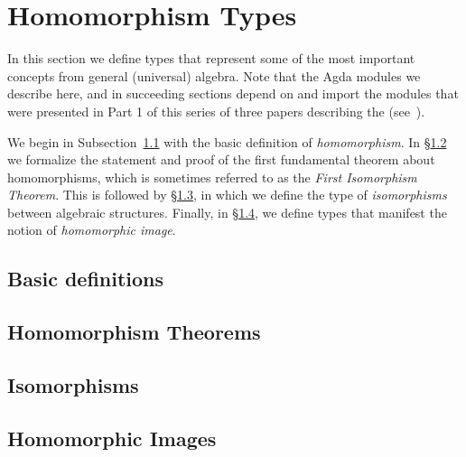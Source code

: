 \section{Homomorphism Types}\label{sec:homomorphism-types}
In this section we define types that represent some of the most important concepts from general (universal) algebra.  Note that the Agda modules we describe here, and in succeeding sections depend on and import the modules that were presented in Part 1 of this series of three papers describing the \agdaualib (see~\cite{DeMeo:2021-1}). 

We begin in Subsection~\ref{sec:basic-definitions} with the basic definition of \emph{homomorphism}. In \S\ref{sec:homom-theor} we formalize the statement and proof of the first fundamental theorem about homomorphisms, which is sometimes referred to as the \emph{First Isomorphism Theorem}. This is followed by \S\ref{sec:isomorphisms}, in which we define the type of \emph{isomorphisms} between algebraic structures.  Finally, in \S\ref{sec:hom-images}, we define types that manifest the notion of \emph{homomorphic image}.

\subsection{Basic definitions}\label{sec:basic-definitions}\firstsentence{\ualibHomBasic}{\urlHomBasic}


\subsection{Homomorphism Theorems}\label{sec:homom-theor}\firstsentence{\ualibNoether}{\urlNoether}


\subsection{Isomorphisms}\label{sec:isomorphisms}\firstsentence{\ualibIsomorphisms}{\urlIsomorphisms}


\subsection{Homomorphic Images}\label{sec:hom-images}\firstsentence{\ualibHomomorphicImages}{\urlHomomorphicImages}

